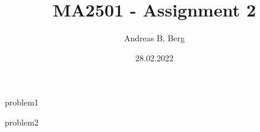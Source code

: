 \documentclass{article}
\begin{document}
\mainmatter

\title{MA2501 - Assignment 2}
\author{Andreas B. Berg}
\date{28.02.2022}
\maketitle
\thispagestyle{fancy}

{problem1}

\pagebreak
{problem2}





\end{document}
